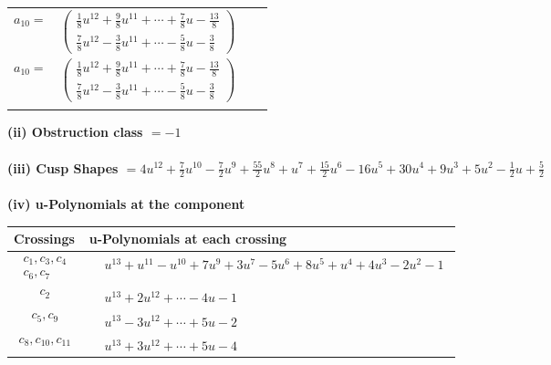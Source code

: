 \documentclass[1p]{elsarticle_modified}
\theoremstyle{definition}
\begin{document}
\begin{tabular}{m{7pt} m{180pt} m{7pt} m{180pt} }
\flushright $a_{10}=$&$\begin{pmatrix}\frac{1}{8} u^{12}+\frac{9}{8} u^{11}+\cdots+\frac{7}{8} u-\frac{13}{8}\\\frac{7}{8} u^{12}-\frac{3}{8} u^{11}+\cdots-\frac{5}{8} u-\frac{3}{8}\end{pmatrix}$\\ \flushright $a_{10}=$&$\begin{pmatrix}\frac{1}{8} u^{12}+\frac{9}{8} u^{11}+\cdots+\frac{7}{8} u-\frac{13}{8}\\\frac{7}{8} u^{12}-\frac{3}{8} u^{11}+\cdots-\frac{5}{8} u-\frac{3}{8}\end{pmatrix}$\\&\end{tabular}
\flushleft \textbf{(ii) Obstruction class $= -1$}\\~\\
\flushleft \textbf{(iii) Cusp Shapes $= 4 u^{12}+\frac{7}{2} u^{10}-\frac{7}{2} u^9+\frac{55}{2} u^8+u^7+\frac{15}{2} u^6-16 u^5+30 u^4+9 u^3+5 u^2-\frac{1}{2} u+\frac{5}{2}$}\\~\\
\newpage\renewcommand{\arraystretch}{1}
\flushleft \textbf{(iv) u-Polynomials at the component}\newline \\
\begin{tabular}{m{50pt}|m{274pt}}
Crossings & \hspace{64pt}u-Polynomials at each crossing \\
\hline $$\begin{aligned}c_{1},c_{3},c_{4}\\c_{6},c_{7}\end{aligned}$$&$\begin{aligned}
&u^{13}+u^{11}- u^{10}+7 u^9+3 u^7-5 u^6+8 u^5+u^4+4 u^3-2 u^2-1
\end{aligned}$\\
\hline $$\begin{aligned}c_{2}\end{aligned}$$&$\begin{aligned}
&u^{13}+2 u^{12}+\cdots-4 u-1
\end{aligned}$\\
\hline $$\begin{aligned}c_{5},c_{9}\end{aligned}$$&$\begin{aligned}
&u^{13}-3 u^{12}+\cdots+5 u-2
\end{aligned}$\\
\hline $$\begin{aligned}c_{8},c_{10},c_{11}\end{aligned}$$&$\begin{aligned}
&u^{13}+3 u^{12}+\cdots+5 u-4
\end{aligned}$\\
\hline
\end{tabular}\\~\\
\end{document}
